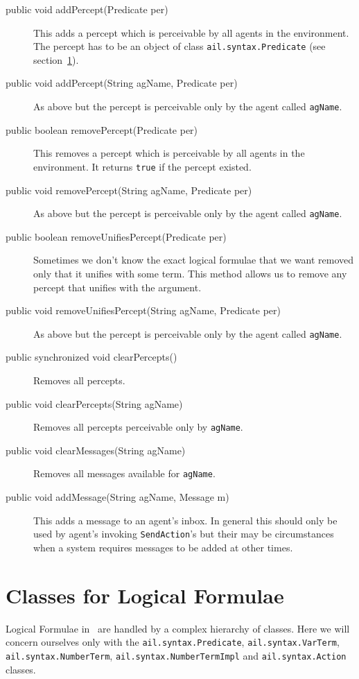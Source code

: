 \begin{description}
\item[public void addPercept(Predicate per)] This adds a percept which is perceivable by all agents in the environment.  The percept has to be an object of class \texttt{ail.syntax.Predicate} (see section~\ref{s:formulas}).
\item[public void addPercept(String agName, Predicate per)] As above but the percept is perceivable only by the agent called \texttt{agName}.
\item[public boolean removePercept(Predicate per)] This removes a percept which is perceivable by all agents in the environment.  It returns \texttt{true} if the percept existed.
\item[public void removePercept(String agName, Predicate per)] As above but the percept is perceivable only by the agent called \texttt{agName}.
\item[public boolean removeUnifiesPercept(Predicate per)]  Sometimes we don't know the exact logical formulae that we want removed only that it unifies with some term.  This method allows us to remove any percept that unifies with the argument.
\item[public void removeUnifiesPercept(String agName, Predicate per)] As above but the percept is perceivable only by the agent called \texttt{agName}.
\item[public synchronized void clearPercepts()] Removes all percepts.
\item[public void clearPercepts(String agName)] Removes all percepts perceivable only by \texttt{agName}.
\item[public void clearMessages(String agName)] Removes all messages available for \texttt{agName}.
\item[public void addMessage(String agName, Message m)] This adds a message to an agent's inbox.  In general this should only be used by agent's invoking \texttt{SendAction}'s but their may be circumstances when a system requires messages to be added at other times.
\end{description}

\section{Classes for Logical Formulae}
\label{s:formulas}

Logical Formulae in \ail\ are handled by a complex hierarchy of classes.  Here we will concern ourselves only with the \texttt{ail.syntax.Predicate}, \texttt{ail.syntax.VarTerm}, \texttt{ail.syntax.NumberTerm}, \texttt{ail.syntax.NumberTermImpl} and \texttt{ail.syntax.Action} classes.

